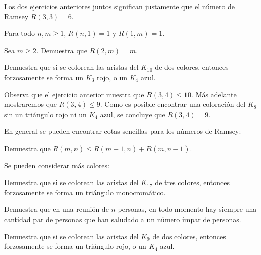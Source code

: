 Los dos ejercicios anteriores juntos significan justamente que el número de Ramsey $R(3,3)=6$.
\newpage

\begin{ejercicio}
Para todo $n,m\geq 1$, $R(n,1)= 1$ y $R(1,m)=1$.
\end{ejercicio}
\vspace{2cm}

\begin{ejercicio}
Sea $m\geq 2$. Demuestra que $R(2,m)= m$.
\end{ejercicio}
\vspace{2cm}

\begin{ejercicio}
Demuestra que si se colorean las aristas del $K_{10}$ de dos colores, entonces forzosamente se forma un $K_3$ rojo, o un $K_4$ azul.
\end{ejercicio}
\vspace{2cm}

Observa que el ejercicio anterior muestra que $R(3,4)\leq 10$. Más adelante mostraremos que $R(3,4)\leq 9$. Como es posible encontrar una coloración del $K_8$ sin un triángulo rojo ni un $K_4$ azul, se concluye que $R(3,4)=9$.

En general se pueden encontrar cotas sencillas para los números de Ramsey:

\begin{ejercicio}
Demuestra que $R(m,n)\leq R(m-1,n)+ R(m,n-1)$.
\end{ejercicio}
\vspace{2cm}

Se pueden considerar más colores:

\begin{ejercicio}
Demuestra que si se colorean las aristas del $K_{17}$ de tres colores, entonces forzosamente se forma un triángulo monocromático.
\end{ejercicio}
\vspace{2cm}

\begin{proposicion}
Demuestra que en una reunión de $n$ personas, en todo momento hay siempre una cantidad par de personas que han saludado a un número impar de personas.
\end{proposicion}
\vspace{2cm}

\begin{ejercicio}
Demuestra que si se colorean las aristas del $K_{9}$ de dos colores, entonces forzosamente se forma un triángulo rojo, o un $K_4$ azul.
\end{ejercicio}
\vspace{2cm}

